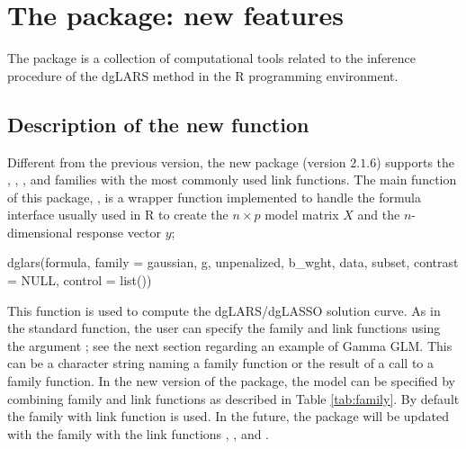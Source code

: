 \bigskip

\section[The dglars package]{The  package: new features}
\label{sec:dglarspkg}

The  package \citep{Augug14b} is a collection of computational tools related to the inference procedure of the dgLARS method in the {R} programming environment. %

\subsection[Description of the dglars() function]{Description of the new  function}

Different from the previous version, the new  package (version $2.1.6$) supports the , , ,  and  families with the most commonly used link functions. The main function of this package, , is a wrapper function implemented to handle the formula interface usually used in {R} to create the $n \times p$ model matrix $X$ and the $n$-dimensional response vector $y$;

\begin{example}
dglars(formula, family = gaussian, g, unpenalized, b_wght, data, subset,
       contrast = NULL, control = list())
\end{example}

This function is used to compute the dgLARS/dgLASSO solution curve. As in the standard  function, the user can specify the family and link functions using the argument ; see the next section regarding an example of Gamma GLM.
This can be a character string naming a family function or the result of a call to a family function. In the new version of the package, the model can be specified by combining family and link functions as described in Table \ref{tab:family}. By default the  family with  link function is used. In the future, the package will be updated with the  family with the link functions , , and .


